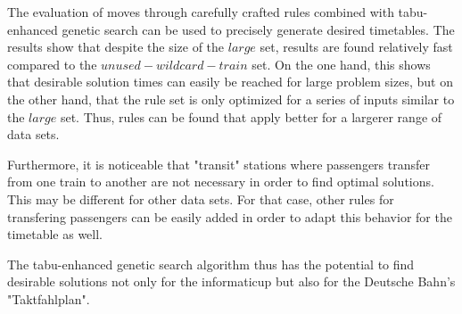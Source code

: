 \documentclass[a4paper,12pt,parskip]{article}
\begin{document}
The evaluation of moves through carefully crafted rules combined with tabu-enhanced
genetic search can be used to precisely generate desired timetables. The results 
show that despite the size of the $large$ set, results are found relatively fast 
compared to the $unused-wildcard-train$ set. On the one hand, this shows that 
desirable solution times can easily be reached for large problem sizes, but on 
the other hand, that the rule set is only optimized for a series of inputs similar 
to the $large$ set. Thus, rules can be found that apply better for a largerer range 
of data sets.

Furthermore, it is noticeable that "transit" stations where passengers transfer 
from one train to another are not necessary in order to find optimal solutions. 
This may be different for other data sets. For that case, other rules for 
transfering passengers can be easily added in order to adapt this behavior for 
the timetable as well.

The tabu-enhanced genetic search algorithm thus has the potential to find desirable 
solutions not only for the informaticup but also for the Deutsche Bahn's 
"Taktfahlplan".

 

\end{document}
